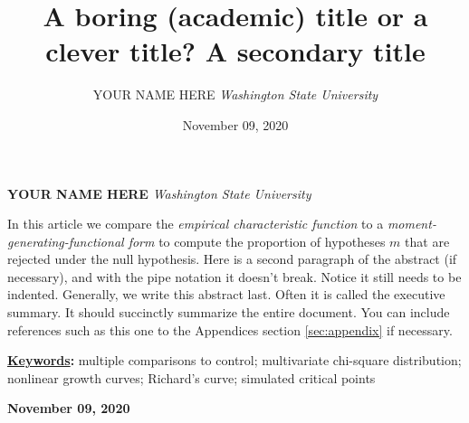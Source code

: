 \documentclass[]{article}
\title{\textbf{\textcolor{WSU.crimson}{A boring (academic) title or a
clever title?}} \newline \textbf{\textcolor{WSU.gray}{A secondary
title}}  }
\author{\Large YOUR NAME
HERE\vspace{0.05in} \newline\normalsize\emph{Washington State
University}  }
\date{November 09, 2020}
\newcommand*{\authorfont}{\fontfamily{phv}\selectfont}
\renewenvironment{abstract}
 {{%
    \setlength{\leftmargin}{0mm}
    \setlength{\rightmargin}{\leftmargin}%
  }%
  \relax}
 {\endlist}
\begin{document}
	
%    


{%
\setlength{\parindent}{0pt}
\thispagestyle{plain}
{\fontsize{18}{20}\selectfont\raggedright 
\maketitle  %

}

{
   \vskip 13.5pt\relax \normalsize\fontsize{11}{12} 
   
\textbf{\authorfont YOUR NAME HERE} \hskip 15pt \emph{\small Washington
State University}   

}

}








\begin{abstract}

    \hbox{\vrule height .2pt width 39.14pc}

    \vskip 8.5pt %

\noindent In this article we compare the
\emph{empirical characteristic function} \citep{Tukey:1977, Becker:1988}
to a \emph{moment-generating-functional form} to compute the proportion
of hypotheses \(m\) that are rejected under the null hypothesis.
\vspace{0.25in} \noindent Here is a second paragraph of the abstract (if
necessary), and with the pipe notation it doesn't break. Notice it still
needs to be indented. \vspace{0.25in} \noindent Generally, we write this
abstract last. Often it is called the executive summary. It should
succinctly summarize the entire document. You can include references
such as this one to the Appendices section \ref{sec:appendix} if
necessary.


\vskip 8.5pt \noindent \textbf{\underline{Keywords}:} multiple
comparisons to control; multivariate chi-square distribution; nonlinear
growth curves; Richard's curve; simulated critical points \par

    




    
    \hbox{\vrule height .2pt width 39.14pc}
    \vskip 5pt 
    \hfill \textbf{\textcolor{WSU.gray}{ November 09, 2020 } }
    \vskip 5pt 
    
\end{abstract}
\end{document}
